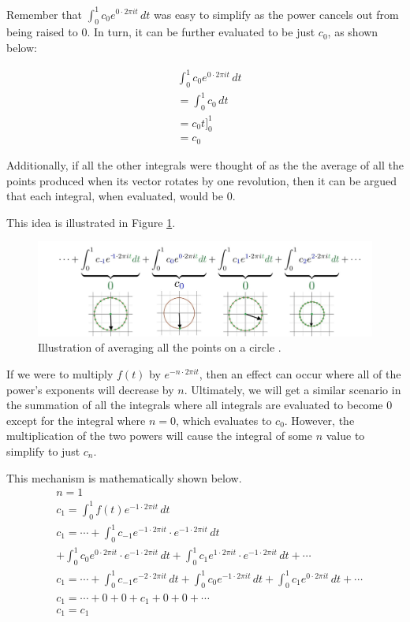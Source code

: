 \documentclass[letterpaper, 12pt]{article}
\begin{document}
Remember that \(\int_{0}^{1} c_{0} e^{0 \cdot 2\pi it} \,dt\) was easy to simplify
as the power cancels out from being raised to 0. In turn, it can be further
evaluated to be just \(c_0\), as shown below:

\begin{align*}
     & \int_{0}^{1} c_{0} e^{0 \cdot 2\pi it} \,dt
    \\
     & = \int_{0}^{1} c_{0} \,dt
    \\
     & = c_{0}t]_{0}^1
    \\
     & = c_{0}
\end{align*}

Additionally, if all the other integrals were thought of as the the average of all
the points produced when its vector rotates by one revolution, then it can
be argued that each integral, when evaluated, would be 0.

This idea is illustrated in Figure \ref*{fig:circle_integ}.

\begin{figure}[H]
    \centering
    \includegraphics[width=\textwidth]{circle_integ.jpeg}
    \caption{Illustration of averaging all the points on a circle \protect\cite{sandersonWhatFourierSeries2019}.}
    \label{fig:circle_integ}
\end{figure}

If we were to multiply \(f(t)\) by \(e^{-n \cdot 2\pi it}\), then an effect can occur
where all of the power's exponents will decrease by \(n\). Ultimately, we will
get a similar scenario in the summation of all the integrals where
all integrals are evaluated to become 0 except for the integral
where \(n = 0\), which evaluates to \(c_0\). However, the multiplication
of the two powers will cause the integral of some \(n\) value to simplify to just
\(c_n\).

This mechanism is mathematically shown below.
\begin{align*}
     & n = 1
    \\
     & c_1 = \int_{0}^{1} f(t) e^{-1 \cdot 2\pi it} \,dt
    \\
     & c_1 = \cdots + \int_{0}^{1} c_{-1} e^{-1 \cdot 2\pi it} \cdot e^{-1 \cdot 2\pi it} \,dt
    \\
     & + \int_{0}^{1} c_{0} e^{0 \cdot 2\pi it} \cdot e^{-1 \cdot 2\pi it} \,dt + \int_{0}^{1} c_{1} e^{1 \cdot 2\pi it} \cdot e^{-1 \cdot 2\pi it} \,dt + \cdots
    \\
     & c_1 = \cdots + \int_{0}^{1} c_{-1} e^{-2 \cdot 2\pi it} \,dt + \int_{0}^{1} c_{0} e^{-1 \cdot 2\pi it} \,dt + \int_{0}^{1} c_{1} e^{0 \cdot 2\pi it} \,dt + \cdots
    \\
     & c_1 = \cdots + 0 + 0 + c_1 + 0 + 0 + \cdots
    \\
     & c_1 = c_1
\end{align*}
\end{document}

